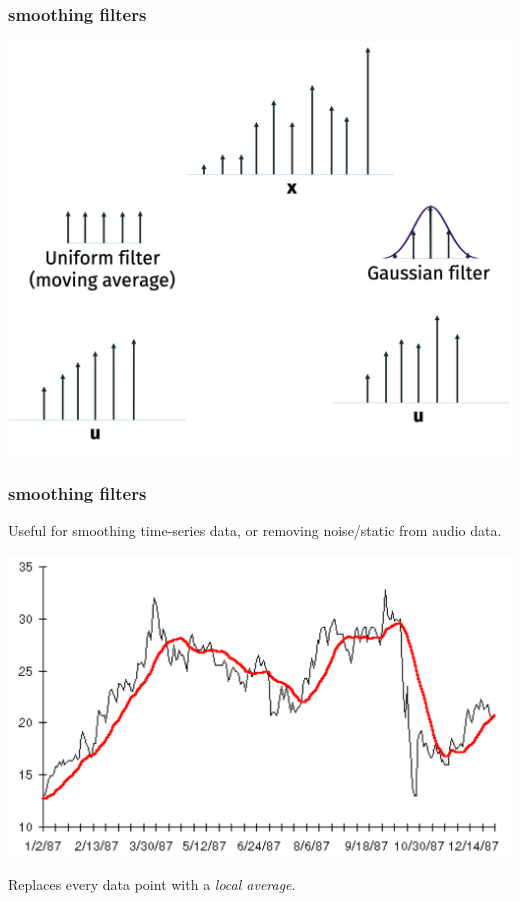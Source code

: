 \documentclass[handout,compress]{beamer}
\begin{document}
	\begin{frame}
	\frametitle{smoothing filters}
	\begin{center}
		\includegraphics[width=.9\textwidth]{smoothing1d.png}
	\end{center}
	\end{frame}

	\begin{frame}
	\frametitle{smoothing filters}
	Useful for smoothing time-series data, or removing noise/static from audio data. 
	\begin{center}
		\includegraphics[width=.5\textwidth]{smoothtime_series.png}
	\end{center}
	Replaces every data point with a \emph{local average}.
	\end{frame}
\end{document}
